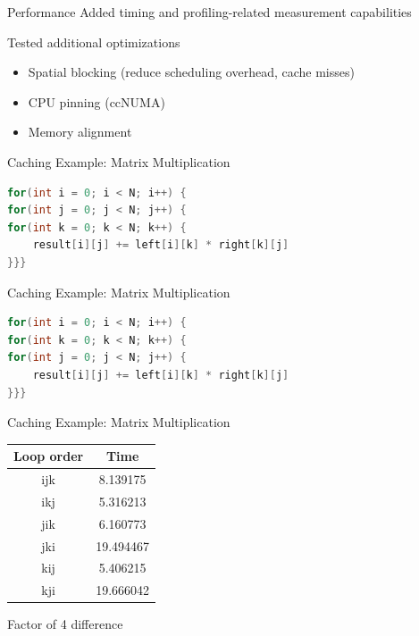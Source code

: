 \documentclass{beamer}
\begin{document}
    \begin{frame}{Performance}
        Added timing and profiling-related measurement capabilities

        \vfill

        Tested additional optimizations
        \begin{itemize}
            \item Spatial blocking (reduce scheduling overhead, cache misses)
            \item CPU pinning (ccNUMA)
            \item Memory alignment
        \end{itemize}
    \end{frame}

    \begin{frame}[fragile=singleslide]{Caching Example: Matrix Multiplication}
        \begin{lstlisting}[language=C]
for(int i = 0; i < N; i++) {
for(int j = 0; j < N; j++) {
for(int k = 0; k < N; k++) {
    result[i][j] += left[i][k] * right[k][j]
}}}
        \end{lstlisting}
    \end{frame}

    \begin{frame}[fragile=singleslide]{Caching Example: Matrix Multiplication}
        \begin{lstlisting}[language=C]
for(int i = 0; i < N; i++) {
for(int k = 0; k < N; k++) {
for(int j = 0; j < N; j++) {
    result[i][j] += left[i][k] * right[k][j]
}}}
        \end{lstlisting}
    \end{frame}

    \begin{frame}{Caching Example: Matrix Multiplication}
        \begin{center}
            \begin{tabular}{cc}
                \toprule
                Loop order & Time \\
                \midrule
                ijk & 8.139175 \\
                ikj & 5.316213 \\
                jik & 6.160773 \\
                jki & 19.494467 \\
                kij & 5.406215 \\
                kji & 19.666042 \\
                \bottomrule
            \end{tabular}
        \end{center}

        \vfill

        \alert{Factor of 4 difference}
    \end{frame}
\end{document}
